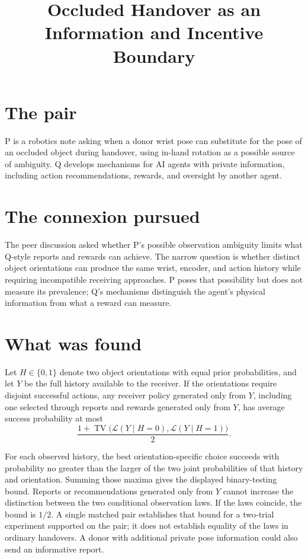 \documentclass{article}
\title{Occluded Handover as an Information and Incentive Boundary}
\begin{document}
\maketitle

\section{The pair}

P is a robotics note asking when a donor wrist pose can substitute for the pose of an occluded object during handover, using in-hand rotation as a possible source of ambiguity. Q develops mechanisms for AI agents with private information, including action recommendations, rewards, and oversight by another agent.

\section{The connexion pursued}

The peer discussion asked whether P's possible observation ambiguity limits what Q-style reports and rewards can achieve. The narrow question is whether distinct object orientations can produce the same wrist, encoder, and action history while requiring incompatible receiving approaches. P poses that possibility but does not measure its prevalence; Q's mechanisms distinguish the agent's physical information from what a reward can measure. 

\section{What was found}

\begin{claim}
Let \(H\in\{0,1\}\) denote two object orientations with equal prior probabilities, and let \(Y\) be the full history available to the receiver. If the orientations require disjoint successful actions, any receiver policy generated only from \(Y\), including one selected through reports and rewards generated only from \(Y\), has average success probability at most
\[
\frac{1+\operatorname{TV}\bigl(\mathcal L(Y\mid H=0),
                              \mathcal L(Y\mid H=1)\bigr)}{2}.
\]
\end{claim}

For each observed history, the best orientation-specific choice succeeds with probability no greater than the larger of the two joint probabilities of that history and orientation. Summing those maxima gives the displayed binary-testing bound. Reports or recommendations generated only from \(Y\) cannot increase the distinction between the two conditional observation laws. If the laws coincide, the bound is \(1/2\). A single matched pair establishes that bound for a two-trial experiment supported on the pair; it does not establish equality of the laws in ordinary handovers. A donor with additional private pose information could also send an informative report. 
\end{document}
